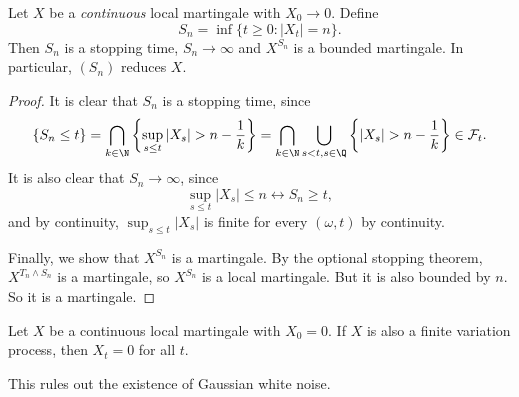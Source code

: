 \documentclass[a4paper]{article}
\begin{document}
\begin{prop}
  Let $X$ be a \emph{continuous} local martingale with $X_0 \to 0$. Define
  \[
    S_n = \inf \{t \geq 0 : |X_t| = n \}.
  \]
  Then $S_n$ is a stopping time, $S_n \to \infty$ and $X^{S_n}$ is a bounded martingale. In particular, $(S_n)$ reduces $X$.
\end{prop}

\begin{proof}
  It is clear that $S_n$ is a stopping time, since
  \[
    \{S_n \leq t\} = \bigcap_{k \in \N} \left\{\sup_{s \leq t} |X_s| > n - \frac{1}{k}\right\} = \bigcap_{k \in \N} \bigcup_{s < t, s \in \Q} \left\{|X_s| > n - \frac{1}{k}\right\} \in \mathcal{F}_t.
  \]
  It is also clear that $S_n \to \infty$, since
  \[
    \sup_{s \leq t} |X_s| \leq n \leftrightarrow S_n \geq t,
  \]
  and by continuity, $\sup_{s \leq t} |X_s|$ is finite for every $(\omega, t)$ by continuity.

  Finally, we show that $X^{S_n}$ is a martingale. By the optional stopping theorem, $X^{T_n \wedge S_n}$ is a martingale, so $X^{S_n}$ is a local martingale. But it is also bounded by $n$. So it is a martingale.
\end{proof}

\begin{thm}
  Let $X$ be a continuous local martingale with $X_0 = 0$. If $X$ is also a finite variation process, then $X_t = 0$ for all $t$.
\end{thm}
This rules out the existence of Gaussian white noise.
\end{document}
